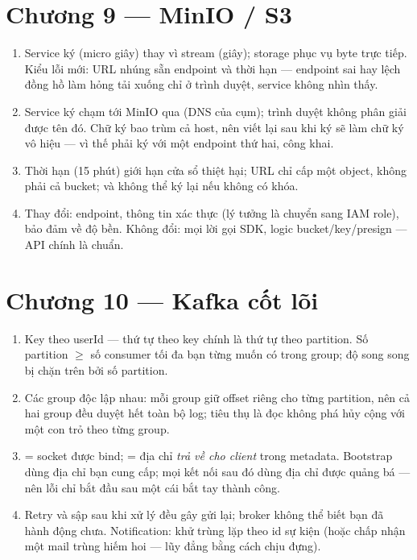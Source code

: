 \section*{Chương 9 --- MinIO / S3}
\begin{enumerate}
  \item Service ký (micro giây) thay vì stream (giây); storage phục vụ
  byte trực tiếp. Kiểu lỗi mới: URL nhúng sẵn endpoint và thời hạn ---
  endpoint sai hay lệch đồng hồ làm hỏng tải xuống chỉ ở trình duyệt,
  service không nhìn thấy.
  \item Service ký chạm tới MinIO qua  (DNS của cụm);
  trình duyệt không phân giải được tên đó. Chữ ký bao trùm cả host,
  nên viết lại sau khi ký sẽ làm chữ ký vô hiệu --- vì thế phải ký
  với một endpoint thứ hai, công khai.
  \item Thời hạn (15 phút) giới hạn cửa sổ thiệt hại; URL chỉ cấp một
  object, không phải cả bucket; và không thể ký lại nếu không có khóa.
  \item Thay đổi: endpoint, thông tin xác thực (lý tưởng là chuyển
  sang IAM role), bảo đảm về độ bền. Không đổi: mọi lời gọi SDK, logic
  bucket/key/presign --- API chính là chuẩn.
\end{enumerate}

\section*{Chương 10 --- Kafka cốt lõi}
\begin{enumerate}
  \item Key theo userId --- thứ tự theo key chính là thứ tự theo
  partition. Số partition $\geq$ số consumer tối đa bạn từng muốn có
  trong group; độ song song bị chặn trên bởi số partition.
  \item Các group độc lập nhau: mỗi group giữ offset riêng cho từng
  partition, nên cả hai group đều duyệt hết toàn bộ log; tiêu thụ là
  đọc không phá hủy cộng với một con trỏ theo từng group.
  \item {} = socket được bind; 
  = địa chỉ \emph{trả về cho client} trong metadata. Bootstrap dùng
  địa chỉ bạn cung cấp; mọi kết nối sau đó dùng địa chỉ được quảng bá
  --- nên lỗi chỉ bắt đầu sau một cái bắt tay thành công.
  \item Retry và sập sau khi xử lý đều gây gửi lại; broker không thể
  biết bạn đã hành động chưa. Notification: khử trùng lặp theo id sự
  kiện (hoặc chấp nhận một mail trùng hiếm hoi --- lũy đẳng bằng cách
  chịu đựng).
\end{enumerate}

